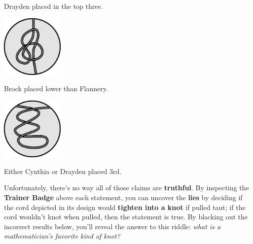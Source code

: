 \begin{multicols}{3}
\begin{center}
    Drayden placed in the top three.


    \includegraphics[width=1.2in]{assets/knot3.pdf}

    Brock placed lower than Flannery.


    \includegraphics[width=1.2in]{assets/unknot3.pdf}

    Either Cynthia or Drayden placed 3rd.
  \end{center}
\end{multicols}

Unfortunately, there's no way all of those claims are \textbf{truthful}.
By inspecting the \textbf{Trainer Badge} above each statement, you can uncover
the \textbf{lies} by deciding if the cord depicted in its design would
\textbf{tighten into a knot} if pulled taut; if the cord wouldn't knot when
pulled, then the statement is true. By blacking out the incorrect
results below, you'll reveal the answer to this riddle: \textit{what is a
mathematician's favorite kind of knot?}

\begin{center}\footnotesize
{}
\end{center}

